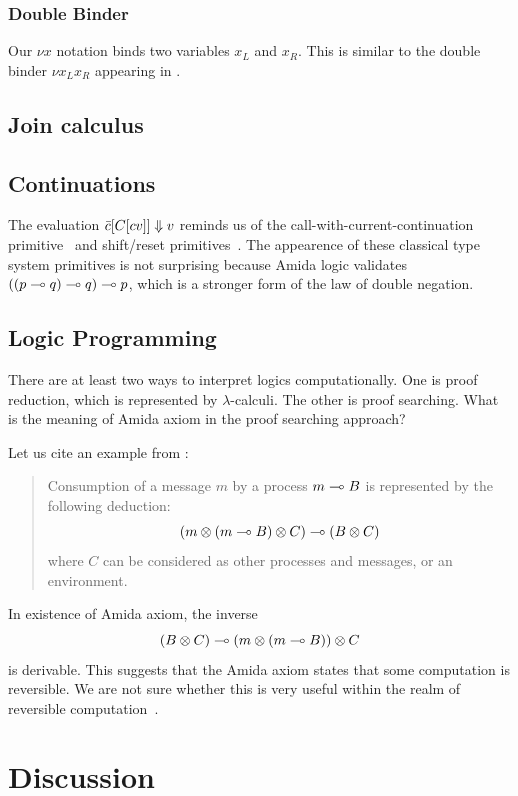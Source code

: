  \subsubsection{Double Binder}
 Our $\nu x$ notation binds two variables $x_L$ and $x_R$.
 This is similar to the double binder $\nu x_L x_R$ appearing in
 \citet{gay2010}.

 \subsection{Join calculus}

 \subsection{Continuations}
 The evaluation $\bar{c}[C[cv]]\Downarrow v$ reminds us of the call-with-current-continuation
 primitive~\citep{rees1986} and shift/reset primitives~\citep{danvy1990,asai2007}.
 The appearence of these classical type system primitives is not
 surprising because Amida logic validates $((p\multimap q)\multimap q)\multimap p$,
 which is a stronger form of the law of double negation.

 \subsection{Logic Programming}

 There are at least two ways to interpret logics computationally.
 One is proof reduction, which is represented by $\lambda$-calculi.
 The other is proof searching.  What is the meaning of Amida axiom in
 the proof searching approach?

 Let us cite an example from \citet[A.2]{kobayashi-yonezawa}:
 \begin{quote}
  Consumption of a message $m$ by a process $m\multimap B$ is represented by
  the following deduction:
  \[
   (m\otimes(m\multimap B)\otimes C)\multimap (B\otimes C)
  \]
  where $C$ can be considered as other processes and messages, or an environment.
 \end{quote}
 In existence of Amida axiom,
 the inverse
 \[
  (B\otimes C)\multimap (m\otimes (m\multimap B))\otimes C
 \]
 is derivable.
 This suggests that the Amida axiom states that some
 computation is reversible.  We are not sure whether this is very
 useful within the realm of reversible computation~\citep{revcon}.

\section{Discussion}

